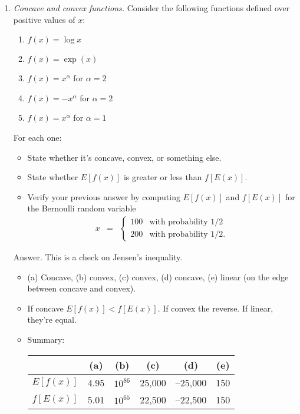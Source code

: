 \documentclass[11pt]{article}
\begin{document}
\begin{enumerate}
\item  {\it Concave and convex functions.\/}
Consider the following functions defined over positive values of $x$:
%
\begin{enumerate}
\item $f(x) = \log x$
\item $f(x) = \exp(x) $
\item $f(x) = x^{\alpha}$ for $\alpha = 2$
\item $f(x) = - x^{\alpha}$ for $\alpha = 2$
\item $f(x) = x^{\alpha} $ for $\alpha = 1$
\end{enumerate}
For each one:
\begin{itemize}
\item State whether it's concave, convex, or something else.
\item State whether $ E[f(x)]$ is greater or less than $f[E(x)]$.
\item Verify your previous answer by computing
 $ E[f(x)]$ and $f[E(x)]$
 for the Bernoulli random variable
\begin{eqnarray*}
    x &=& \left\{
            \begin{array}{ll}
            100   & \mbox{with probability } 1/2 \\
            200 & \mbox{with probability }   1/2 .
            \end{array}
            \right.
\end{eqnarray*}
\end{itemize}

Answer.  
This is a check on Jensen's inequality.
\begin{itemize}
\item (a) Concave, (b) convex, (c) convex, (d) concave, (e) linear
(on the edge between concave and convex).
\item If concave $ E[f(x)] < f[E(x)]$.  If convex the reverse.
If linear, they're equal.
\item Summary: \\
\begin{center}
\begin{tabular}{lccccc}
\toprule
        & (a) & (b) & (c) & (d) & (e) \\
\midrule
$E[f(x)]$ & 4.95 & $10^{86}$ & 25,000 & --25,000 & 150 \\
$f[E(x)]$ & 5.01 & $10^{65}$ & 22,500 & --22,500 & 150 \\
\bottomrule
\end{tabular}
\end{center}
\end{itemize}
\bigskip



\end{enumerate}
\end{document}
